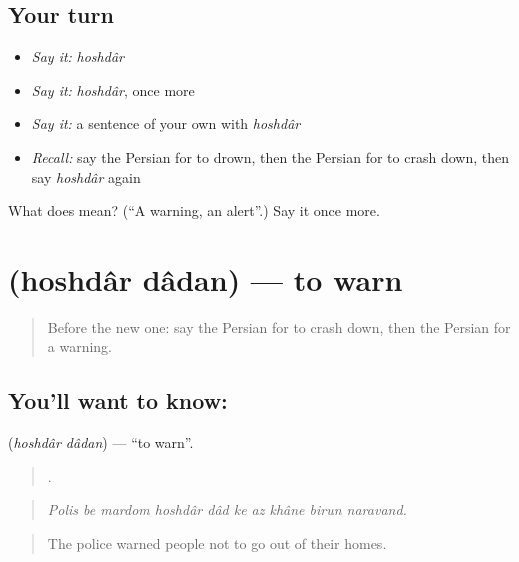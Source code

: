 \subsection*{Your turn}
\begin{itemize}
\raggedright
  \item \emph{Say it:} \emph{hoshdâr}
  \item \emph{Say it:} \emph{hoshdâr}, once more
  \item \emph{Say it:} a sentence of your own with \emph{hoshdâr}
  \item \emph{Recall:} say the Persian for to drown, then the Persian for to crash down, then say \emph{hoshdâr} again
\end{itemize}

\begin{tcolorbox}[breakable,colback=teal!4,colframe=teal!35!black,title={Before you move on}]
What does  mean? (\textquotedblleft{}A warning, an alert\textquotedblright{}.) Say it once more.
\end{tcolorbox}
\section[\texorpdfstring{\fa{هشدار} \fa{دادن} (hoshdâr dâdan)}{هشدار دادن (hoshdâr dâdan)}]{  (hoshdâr dâdan) — to warn}

\label{lesson:FA-C330-hoshdar-dadan}



\begin{quote}
Before the new one: say the Persian for to crash down, then the Persian for a warning.
\end{quote}

\subsection*{You'll want to know:  }
\textbf{ } (\emph{hoshdâr dâdan}) — \textquotedblleft{}to warn\textquotedblright{}.

\begin{quote}
         .
\end{quote}

\begin{quote}
\emph{Polis be mardom hoshdâr dâd ke az khâne birun naravand.}
\end{quote}

\begin{quote}
The police warned people not to go out of their homes.
\end{quote}

